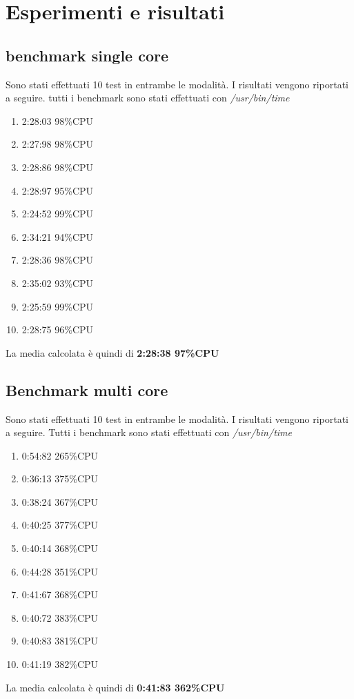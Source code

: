 \documentclass[../main.tex]{subfiles}
\begin{document}
\chapter{Esperimenti e risultati}

\section{benchmark single core}

Sono stati effettuati 10 test in entrambe le modalità. I risultati vengono riportati a seguire.
tutti i benchmark sono stati effettuati con \textit{/usr/bin/time}

\begin{enumerate}
				\item 2:28:03 98\%CPU
				\item 2:27:98 98\%CPU
				\item 2:28:86 98\%CPU
				\item 2:28:97 95\%CPU
				\item 2:24:52 99\%CPU
				\item 2:34:21 94\%CPU
				\item 2:28:36 98\%CPU
				\item 2:35:02 93\%CPU
				\item 2:25:59 99\%CPU
				\item 2:28:75 96\%CPU
\end{enumerate}

La media calcolata è quindi di \textbf{2:28:38 97\%CPU}


\section{Benchmark multi core}

Sono stati effettuati 10 test in entrambe le modalità. I risultati vengono riportati a seguire.
Tutti i benchmark sono stati effettuati con \textit{/usr/bin/time}

\begin{enumerate}
				\item 0:54:82 265\%CPU
				\item 0:36:13 375\%CPU
				\item 0:38:24 367\%CPU
				\item 0:40:25 377\%CPU
				\item 0:40:14 368\%CPU
				\item 0:44:28 351\%CPU
				\item 0:41:67 368\%CPU
				\item 0:40:72 383\%CPU
				\item 0:40:83 381\%CPU
				\item 0:41:19 382\%CPU
\end{enumerate}
La media calcolata è quindi di \textbf{0:41:83 362\%CPU}
\end{document}
